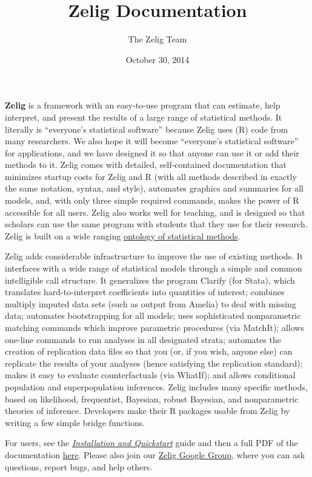 \documentclass[letterpaper,10pt,english]{sphinxmanual}
\title{Zelig Documentation}
\date{October 30, 2014}
\author{The Zelig Team}
\begin{document}
\maketitle
\tableofcontents
{}\label{index::doc}


\textbf{Zelig} is a framework with an easy-to-use program that can estimate, help interpret, and present the results of a large range of statistical methods. It literally is ``everyone's statistical software'' because Zelig uses (R) code from many researchers. We also hope it will become ``everyone's statistical software'' for applications, and we have designed it so that anyone can use it or add their methods to it. Zelig comes with detailed, self-contained documentation that minimizes startup costs for Zelig and R (with all methods described in exactly the same notation, syntax, and style), automates graphics and summaries for all models, and, with only three simple required commands, makes the power of R accessible for all users. Zelig also works well for teaching, and is designed so that scholars can use the same program with students that they use for their research. Zelig is built on a wide ranging \href{http://gking.harvard.edu/files/abs/z-abs.shtml}{ontology of statistical methods}.

Zelig adds considerable infrastructure to improve the use of existing methods. It interfaces with a wide range of statistical models through a simple and common intelligible call structure. It generalizes the program Clarify (for Stata), which translates hard-to-interpret coefficients into quantities of interest; combines multiply imputed data sets (such as output from Amelia) to deal with missing data; automates bootstrapping for all models; uses sophisticated nonparametric matching commands which improve parametric procedures (via MatchIt); allows one-line commands to run analyses in all designated strata; automates the creation of replication data files so that you (or, if you wish, anyone else) can replicate the results of your analyses (hence satisfying the replication standard); makes it easy to evaluate counterfactuals (via WhatIf); and allows conditional population and superpopulation inferences. Zelig includes many specific methods, based on likelihood, frequentist, Bayesian, robust Bayesian, and nonparametric theories of inference.  Developers make their R packages usable from Zelig by writing a few simple bridge functions.

For users, see the {\hyperref[installation_quickstart:installation-quickstart]{\emph{Installation and Quickstart}}} guide and then a full PDF of the documentation \href{http://zeligproject.org/build/latex/Zelig.pdf}{here}. Please also join our \href{https://groups.google.com/forum/\#!forum/zelig-statistical-software}{Zelig Google Group}, where you can ask questions, report bugs, and help others.
\end{document}
